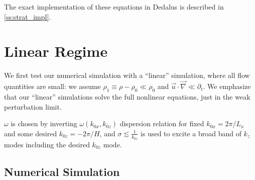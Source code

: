 \documentclass[twocolumn,
        nofootinbib, %
        usenames, %
        aps,
        prd,
        dvipsnames %
    ]{revtex4-1}%
\begin{document}

The exact implementation of these equations in Dedalus is described in
\autoref{ss:strat_impl}.

\section{Linear Regime}\label{s:lin}

We first test our numerical simulation with a ``linear'' simulation, where
all flow quantities are small: we assume  $\rho_1 \equiv \rho - \rho_0 \ll
\rho_0$ and $\vec{u} \cdot \vec{\nabla} \ll \partial_t$. We emphasize that our
``linear'' simulations solve the full nonlinear equations, just in the weak
perturbation limit.

$\omega$ is chosen by inverting $\omega(k_{0x}, k_{0z})$ dispersion relation for fixed
$k_{0x} = 2\pi / L_x$ and some desired $k_{0z} = -2\pi/H$, and $\sigma \lesssim
\frac{1}{k_{0z}}$ is used to excite a broad band of $k_z$ modes including the
desired $k_{0z}$ mode.

\subsection{Numerical Simulation}\label{ss:lin_ns}

\end{document}
